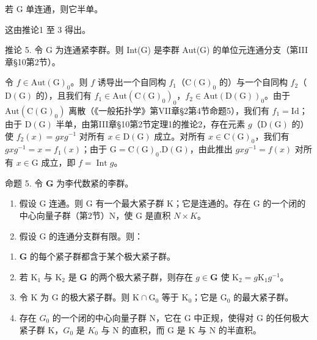 若 \(\mathrm{G}\) 单连通，则它半单。

这由推论1 至 3 得出。

推论 5. 令 G 为连通紧李群。则 Int(G) 是李群 Aut(G) 的单位元连通分支（第III章§10第2节）。

令 \(f \in \mathrm{Aut}(\mathrm{G})_0\)。则 \(f\) 诱导出一个自同构 \(f_1\)（\(\mathrm{C}(\mathrm{G})_0\) 的）与一个自同构 \(f_2\)（\(\mathrm{D}(\mathrm{G})\) 的），且我们有 \(f_1 \in \mathrm{Aut}(\mathrm{C}(\mathrm{G})_0)_0\)，\(f_2 \in \mathrm{Aut}(\mathrm{D}(\mathrm{G}))_0\)。由于 \(\mathrm{Aut}(\mathrm{C}(\mathrm{G})_0)\) 离散（《一般拓扑学》第VII章§2第4节命题5），我们有 \(f_1 = \mathrm{Id}\)；由于 \(\mathrm{D}(\mathrm{G})\) 半单，由第III章§10第2节定理1的推论2，存在元素 \(g\)（\(\mathrm{D}(\mathrm{G})\) 的）使 \(f_2(x) = g x g^{-1}\) 对所有 \(x \in \mathrm{D}(\mathrm{G})\) 成立。对所有 \(x \in \mathrm{C}(\mathrm{G})_0\)，我们有 \(g x g^{-1} = x = f_1(x)\)；由于 \(\mathrm{G} = \mathrm{C}(\mathrm{G})_0.\mathrm{D}(\mathrm{G})\)，由此推出 \(g x g^{-1} = f(x)\) 对所有 \(x \in \mathrm{G}\) 成立，即 \(f = \operatorname{Int} g\)。

命题 5. 令 \(\mathbf{G}\) 为李代数紧的李群。

\begin{enumerate}
\def\labelenumi{\alph{enumi})}
\item
  假设 G 连通。则 G 有一个最大紧子群 K；它是连通的。存在 G 的一个闭的中心向量子群（第2节）N，使 G 是直积 \(N \times K\)。
\item
  假设 G 的连通分支群有限。则：
\end{enumerate}

\begin{enumerate}
\def\labelenumi{(\roman{enumi})}
\item
  \(\mathbf{G}\) 的每个紧子群都含于某个极大紧子群。
\item
  若 \(\mathrm{K}_1\) 与 \(\mathrm{K}_2\) 是 \(\mathbf{G}\) 的两个极大紧子群，则存在 \(g \in \mathbf{G}\) 使 \(\mathrm{K}_2 = g\mathrm{K}_1g^{-1}\)。
\item
  令 \(\mathrm{K}\) 为 \(\mathrm{G}\) 的极大紧子群。则 \(\mathrm{K} \cap \mathrm{G}_0\) 等于 \(\mathrm{K}_0\)；它是 \(\mathrm{G}_0\) 的最大紧子群。
\item
  存在 \(G_{0}\) 的一个闭的中心向量子群 N，它在 G 中正规，使得对 G 的任何极大紧子群 K，\(G_{0}\) 是 \(K_{0}\) 与 N 的直积，而 G 是 K 与 N 的半直积。
\end{enumerate}

